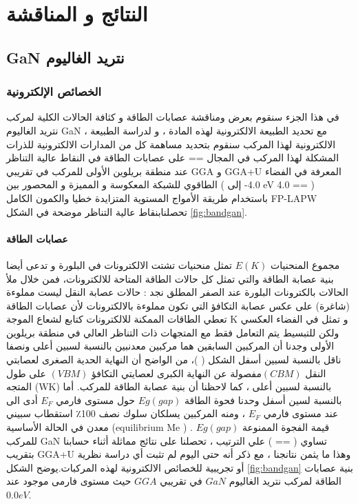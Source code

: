 \chapter{النتائج و المناقشة } %

\label{Chapter3} %


\section{GaN نتريد الغاليوم }
\subsection{الخصائص الإلكترونية }

في هذا الجزء سنقوم بعرض ومناقشة عصابات الطاقة و كثافة الحالات الكلية لمركب نتريد الغاليوم GaN ، مع تحديد الطبيعة الالكترونية لهذه المادة ، و لدراسة الطبيعة الالكترونية لهذا المركب سنقوم بتحديد مساهمة كل من المدارات الالكترونية للذرات المشكلة لهذا المركب في المجال == على عصابات الطاقة في النقاط عالية التناظر عند منطقة بريلوين الأولى للمركب في تقريبي GGA و GGA+U المعرفة في الفضاء الطاقوي للشبكة المعكوسة و المميزة و المحصور بين ( 4.0- إلى eV 4.0 == ) 
باستخدام طريقة الأمواج المستوية المتزايدة خطيا والكمون الكامل FP-LAPW تحصلنابنقاط عالية التناظر موضحة في الشكل \ref{fig:bandgan}.

\subsubsection{عصابات الطاقة}

مجموع المنحنيات  $ E(K) $ تمثل منحنيات تشتت الالكترونات في البلورة و تدعى أيضا بنية عصابة الطاقة والتي تمثل كل حالات الطاقة المتاحة للالكترونات، فمن خلال ملأ الحالات بالكترونات البلورة عند الصفر المطلق نجد : حالات عصابة النقل ليست مملوءة (شاغرة) على عكس عصابة التكافؤ التي تكون مملوءة بالالكترونات لأن عصابات الطاقة تعطي الطاقات الممكنة للالكترونات كتابع لشعاع الموجة K و تمثل في الفضاء العكسي ولكن للتبسيط يتم التعامل فقط مع المتجهات ذات التناظر العالي في منطقة بريلوين الأولى وجدنا أن المركبين السابقين هما مركبين معدنبين بالنسبة لسبين أعلى ونصفا ناقل بالنسبة لسبين أسفل الشكل (  )، من الواضح أن النهاية الحدية الصغرى لعصابتي النقل $ ( CBM)  $مفصولة عن النهاية الكبرى لعصايتي التكافؤ $ ( VBM ) $ على طول المتجه (WK) بالنسبة لسبين أعلى ، كما لاحظنا أن بنية عصابة الطاقة للمركب. أما بالنسبة لسين أسفل وحدنا فحوة الطاقة $ Eg ( gap ) $ حول مستوى فارمي $ E_{F} $ أدى الى استقطاب سبيني ‫‪٪‬‬100 عند مستوى فارمي $ E_{F} $ ، ومنه المركبين يسلكان سلوك نصف معدن في الحالة الأساسية (equilibrium Me ) . قيمة الفجوة الممنوعة $ Eg ( gap ) $ للمركب GaN تساوي  ( == ) علي الترتيب ، تحصلنا على نتائج مماثلة أثناء حسابنا بتقريب GGA+U وهذا ما يثمن نتانجنا ، مع ذكر أنه حتى اليوم لم تثبت أي دراسة نظرية أو تجريبية للخصائص الالكترونية لهذه المركبات.يوضح الشكل \ref{fig:bandgan} بنية عصابات الطاقة لمركب  نتريد الغاليوم $ GaN  $ في تقريبي $ GGA $  حيث مستوى فارمی موجود عند $0.0 eV $.


